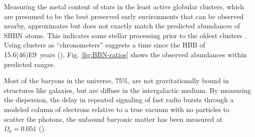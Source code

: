 \documentclass{paper}
\begin{document}
  Measuring the metal content of stars in the least active globular clusters, 
  which are presumed to be the best preserved early environments that can be 
  observed nearby, approximates but does not exactly match the predicted 
  abundances of SBBN atoms. This indicates some stellar processing prior to 
  the oldest clusters \cite{Kalirai_2010}. Using clusters as ``chronometers'' 
  suggests a time since the HBB of 
  \SI{15.6(46)E9}{years} (\cite{1999ApJ...521..194C}).
  Fig. \ref{fig:BBN-ratios} shows the observed abundances within predicted
  ranges.


  Most of the baryons in the universe, 75\%, are not gravitationally bound in 
  structures like galaxies, but are diffuse in the intergalactic medium. By 
  measuring the dispersion, the delay in repeated signaling of fast radio 
  bursts through a modeled column of electrons relative to a true vacuum with 
  no particles to scatter the photons, the unbound baryonic matter has been 
  measured at \(\Omega_b = 0.051\) (\cite{2020Natur.581..391M}).
\end{document}
